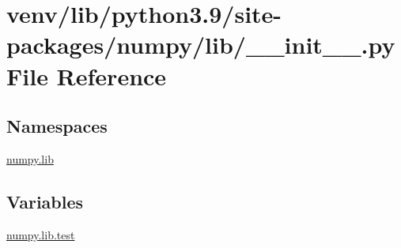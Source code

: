 \hypertarget{venv_2lib_2python3_89_2site-packages_2numpy_2lib_2____init_____8py}{}\section{venv/lib/python3.9/site-\/packages/numpy/lib/\+\_\+\+\_\+init\+\_\+\+\_\+.py File Reference}
\label{venv_2lib_2python3_89_2site-packages_2numpy_2lib_2____init_____8py}
\subsection*{Namespaces}
\begin{DoxyCompactItemize}
\item 
 \hyperlink{namespacenumpy_1_1lib}{numpy.\+lib}
\end{DoxyCompactItemize}
\subsection*{Variables}
\begin{DoxyCompactItemize}
\item 
\hyperlink{namespacenumpy_1_1lib_a544e3a83e32cb3eb085fc525a747d055}{numpy.\+lib.\+test}
\end{DoxyCompactItemize}
